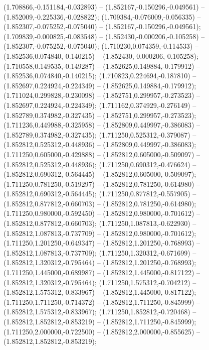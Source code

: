  (1.708866,-0.151184,-0.032893) -- (1.852167,-0.150296,-0.049561) -- (1.852009,-0.225336,-0.028822);
 (1.709384,-0.076009,-0.056335) -- (1.852307,-0.075252,-0.075040) -- (1.852167,-0.150296,-0.049561);
 (1.709839,-0.000825,-0.083548) -- (1.852430,-0.000206,-0.105258) -- (1.852307,-0.075252,-0.075040);
 (1.710230,0.074359,-0.114533) -- (1.852536,0.074840,-0.140215) -- (1.852430,-0.000206,-0.105258);
 (1.710558,0.149535,-0.149287) -- (1.852625,0.149884,-0.179912) -- (1.852536,0.074840,-0.140215);
 (1.710823,0.224694,-0.187810) -- (1.852697,0.224924,-0.224349) -- (1.852625,0.149884,-0.179912);
 (1.711024,0.299828,-0.230098) -- (1.852751,0.299957,-0.273523) -- (1.852697,0.224924,-0.224349);
 (1.711162,0.374929,-0.276149) -- (1.852789,0.374982,-0.327435) -- (1.852751,0.299957,-0.273523);
 (1.711236,0.449988,-0.325958) -- (1.852809,0.449997,-0.386083) -- (1.852789,0.374982,-0.327435);
 (1.711250,0.525312,-0.379087) -- (1.852812,0.525312,-0.448936) -- (1.852809,0.449997,-0.386083);
 (1.711250,0.605000,-0.429888) -- (1.852812,0.605000,-0.509097) -- (1.852812,0.525312,-0.448936);
 (1.711250,0.690312,-0.476624) -- (1.852812,0.690312,-0.564445) -- (1.852812,0.605000,-0.509097);
 (1.711250,0.781250,-0.519297) -- (1.852812,0.781250,-0.614980) -- (1.852812,0.690312,-0.564445);
 (1.711250,0.877812,-0.557905) -- (1.852812,0.877812,-0.660703) -- (1.852812,0.781250,-0.614980);
 (1.711250,0.980000,-0.592450) -- (1.852812,0.980000,-0.701612) -- (1.852812,0.877812,-0.660703);
 (1.711250,1.087813,-0.622930) -- (1.852812,1.087813,-0.737709) -- (1.852812,0.980000,-0.701612);
 (1.711250,1.201250,-0.649347) -- (1.852812,1.201250,-0.768993) -- (1.852812,1.087813,-0.737709);
 (1.711250,1.320312,-0.671699) -- (1.852812,1.320312,-0.795464) -- (1.852812,1.201250,-0.768993);
 (1.711250,1.445000,-0.689987) -- (1.852812,1.445000,-0.817122) -- (1.852812,1.320312,-0.795464);
 (1.711250,1.575312,-0.704212) -- (1.852812,1.575312,-0.833967) -- (1.852812,1.445000,-0.817122);
 (1.711250,1.711250,-0.714372) -- (1.852812,1.711250,-0.845999) -- (1.852812,1.575312,-0.833967);
 (1.711250,1.852812,-0.720468) -- (1.852812,1.852812,-0.853219) -- (1.852812,1.711250,-0.845999);
 (1.711250,2.000000,-0.722500) -- (1.852812,2.000000,-0.855625) -- (1.852812,1.852812,-0.853219);
